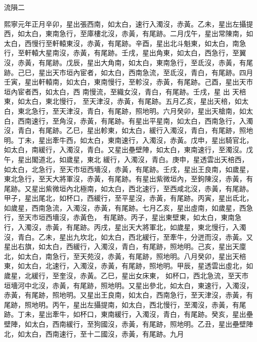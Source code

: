 
\begin{pinyinscope}

 流隕二



 熙寧元年正月辛卯，星出張西南，如太白，速行入濁沒，赤黃。乙未，星出左攝提西，如太白，東南急行，至庫樓北沒，赤黃，有尾跡。二月戊午，星出常陳南，如太白，西慢行至軒轅東沒，赤黃，有尾跡。辛酉，星出北斗魁東，如太白，南急行，至軒轅大星南沒，赤黃，有尾跡。壬戌，星出角東，如太白，西急行，至翼沒，赤黃，有尾跡。戊辰，星出大角南，如太白，東南急行，至氐沒，赤黃，有尾跡。己巳，星出天市垣內宦者，如太白，西南急流，至氐沒，青白，有尾跡。四月壬寅，星出軒轅南，如太白，東南慢行，至軫沒，赤黃，有尾跡。己酉，星出天市垣內宦者西，如太白，西
 南慢流，至織女沒，青白，有尾跡。壬戌，星
 出
 天棓東，如太白，東北慢行，
 至天津沒，赤黃，有尾跡。五月乙亥，星出天棓，如太白，東北急行，至天津沒，青白，有尾跡，照地明。六月癸卯，星出天槍南，如太白，西南速行，至角沒，赤黃，有尾跡。有星出平星南，如太白，西南急行，入濁沒，青白，有尾跡。乙巳，星出軫東，如太白，緩行入濁沒，青白，有尾跡，照地明。丁未，星出牽牛西，如太白，東南速行，入濁沒，赤黃。戊申，星出騎官北，如太白，南緩行，入濁沒，青白。又星出壘壁陣，如太白，東南速行，至濁沒。戊午，星出閣道北，如歲星，東北
 緩行，入濁沒，青白。庚申，星透雲出天棓西，如太白，北急行，至天市垣西墻沒，赤黃，有尾跡。壬戌，星出王良南，如歲星，東北急行，至天大將軍沒，赤黃，有尾跡。有星出紫微垣內，至鉤陳沒，赤黃，有尾跡。又星出紫微垣內北極南，如太白，西北速行，至西咸北沒，赤黃，有尾跡。甲子，星出尾北，如杯口，西緩行，至平星沒，赤黃，有尾跡。丙寅，星出氐北，如歲星，西南急流，入濁沒，赤黃，有尾跡。七月乙亥，星出虛南，如歲星，西急行，至天市垣西墻沒，赤黃色，
 有尾跡。丙子，星出東壁東，如太白，東南急行，入濁沒，赤黃，有尾跡。丙戌，星出天大將軍北，如歲星，東北慢行，入濁沒，青白。乙未，星出九坎北，如太白，西北緩行，至牽牛，分迸而沒，赤黃。又星出右旗，如太白，西緩行，入濁沒，青白，有尾跡，照地明。己亥，星出天廩北，如太白，南急行，至天苑沒，赤黃，有尾跡，照地明。八月癸卯，星出天棓東，如太白，北速行，入濁沒，赤黃，有尾跡，照地明。甲辰，星透雲出虛北，如歲星，北緩行，至奎沒，赤黃。乙巳，星出女床東，
 如杯口，西北急流，至天市垣墻河中北沒，赤黃，有尾跡，照地明。又星出參北，如太白，東速行，入濁沒，赤黃，有尾跡，照地明。又星出王良南，如太白，西南急行，至天津沒，赤黃，有尾跡，照地明。丙午，星出左攝提南，如太白，西北慢行，至濁沒，赤黃，有尾跡。丁未，星出牽牛，如杯口，東南緩行，入濁沒，青白，有尾跡。癸亥，星出壘壁陣，如太白，西南緩行，至狗國沒，赤黃，有尾跡，照地明。乙丑，星出壘壁陣北，如太白，西南速行，至十二國沒，赤黃，有尾跡。九月

\end{pinyinscope}
